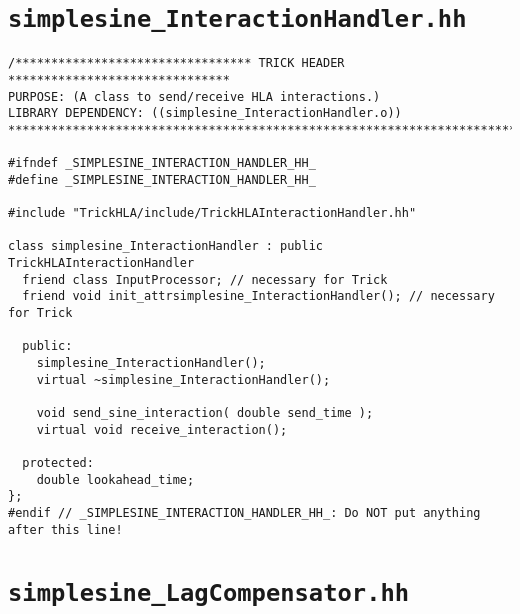 \section{\tt simplesine\_InteractionHandler.hh}\label{sec:simplesine-InteractionHandler-hh}

\begin{lstlisting}[caption={\tt simplesine\_InteractionHandler.hh},label={list:simplesine-InteractionHandler-hh}]
/********************************* TRICK HEADER *******************************
PURPOSE: (A class to send/receive HLA interactions.)
LIBRARY DEPENDENCY: ((simplesine_InteractionHandler.o))
*******************************************************************************/

#ifndef _SIMPLESINE_INTERACTION_HANDLER_HH_
#define _SIMPLESINE_INTERACTION_HANDLER_HH_

#include "TrickHLA/include/TrickHLAInteractionHandler.hh"

class simplesine_InteractionHandler : public TrickHLAInteractionHandler
  friend class InputProcessor; // necessary for Trick
  friend void init_attrsimplesine_InteractionHandler(); // necessary for Trick

  public:
    simplesine_InteractionHandler();
    virtual ~simplesine_InteractionHandler(); 

    void send_sine_interaction( double send_time );
    virtual void receive_interaction();

  protected:
    double lookahead_time;
};
#endif // _SIMPLESINE_INTERACTION_HANDLER_HH_: Do NOT put anything after this line!
\end{lstlisting}

\section{\tt simplesine\_LagCompensator.hh}\label{sec:simplesine-LagCompensator-hh}

